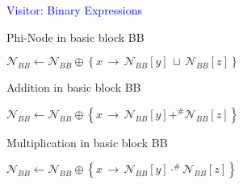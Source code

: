 \documentclass[10pt,handout]{beamer}
\begin{document}
\begin{frame}[fragile]{\textcolor{blue}{Visitor: Binary Expressions}}

\begin{algorithm}[H]
\caption{Phi-Node in basic block BB}
\begin{algorithmic}[1]
\State $\mathcal{N}_{BB}\gets\mathcal{N}_{BB}\oplus\left\lbrace x\,\rightarrow\, \mathcal{N}_{BB}[y] \,\sqcup\, \mathcal{N}_{BB}[z] \right\rbrace$
\EndProcedure
\end{algorithmic}
\end{algorithm}

\begin{algorithm}[H]
\caption{Addition in basic block BB}
\begin{algorithmic}[1]
\State $\mathcal{N}_{BB}\gets\mathcal{N}_{BB}\oplus\left\lbrace x\,\rightarrow\, \mathcal{N}_{BB}[y]+^\# \mathcal{N}_{BB}[z] \right\rbrace$
\EndProcedure
\end{algorithmic}
\end{algorithm}


\begin{algorithm}[H]
\caption{Multiplication in basic block BB}
\begin{algorithmic}[1]
\State $\mathcal{N}_{BB}\gets\mathcal{N}_{BB}\oplus\left\lbrace x\,\rightarrow\, \mathcal{N}_{BB}[y]\cdot^\# \mathcal{N}_{BB}[z] \right\rbrace$
\EndProcedure
\end{algorithmic}
\end{algorithm}

\end{frame}

%
%
%
%
%
%
%
\end{document}
